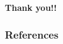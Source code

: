 \documentclass{beamer}
\begin{document}
	\begin{frame}
		\hspace{3cm}\Huge \textbf{Thank you!!}
	\end{frame}	
\begin{frame}
	\frametitle{References}
		
		
\end{frame}
\end{document}
